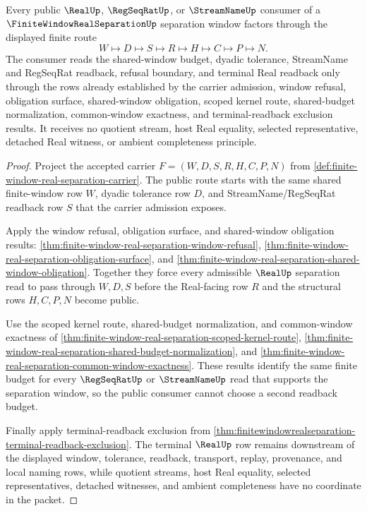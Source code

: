 \begin{theorem}
\label{thm:finite-window-real-separation-public-route}
Every public $\RealUp$, $\RegSeqRatUp$, or $\StreamNameUp$ consumer of a $\FiniteWindowRealSeparationUp$ separation window factors through the displayed finite route
$$
W \longmapsto D \longmapsto S \longmapsto R \longmapsto H \longmapsto C \longmapsto P \longmapsto N .
$$
The consumer reads the shared-window budget, dyadic tolerance, StreamName and RegSeqRat readback, refusal boundary, and terminal Real readback only through the rows already established by the carrier admission, window refusal, obligation surface, shared-window obligation, scoped kernel route, shared-budget normalization, common-window exactness, and terminal-readback exclusion results. It receives no quotient stream, host Real equality, selected representative, detached Real witness, or ambient completeness principle.
\end{theorem}
\begin{proof}
Project the accepted carrier $F=(W,D,S,R,H,C,P,N)$ from \autoref{def:finite-window-real-separation-carrier}. The public route starts with the same shared finite-window row $W$, dyadic tolerance row $D$, and StreamName/RegSeqRat readback row $S$ that the carrier admission exposes.

Apply the window refusal, obligation surface, and shared-window obligation results: \autoref{thm:finite-window-real-separation-window-refusal}, \autoref{thm:finite-window-real-separation-obligation-surface}, and \autoref{thm:finite-window-real-separation-shared-window-obligation}. Together they force every admissible $\RealUp$ separation read to pass through $W,D,S$ before the Real-facing row $R$ and the structural rows $H,C,P,N$ become public.

Use the scoped kernel route, shared-budget normalization, and common-window exactness of \autoref{thm:finite-window-real-separation-scoped-kernel-route}, \autoref{thm:finite-window-real-separation-shared-budget-normalization}, and \autoref{thm:finite-window-real-separation-common-window-exactness}. These results identify the same finite budget for every $\RegSeqRatUp$ or $\StreamNameUp$ read that supports the separation window, so the public consumer cannot choose a second readback budget.

Finally apply terminal-readback exclusion from \autoref{thm:finitewindowrealseparation-terminal-readback-exclusion}. The terminal $\RealUp$ row remains downstream of the displayed window, tolerance, readback, transport, replay, provenance, and local naming rows, while quotient streams, host Real equality, selected representatives, detached witnesses, and ambient completeness have no coordinate in the packet.
\end{proof}

